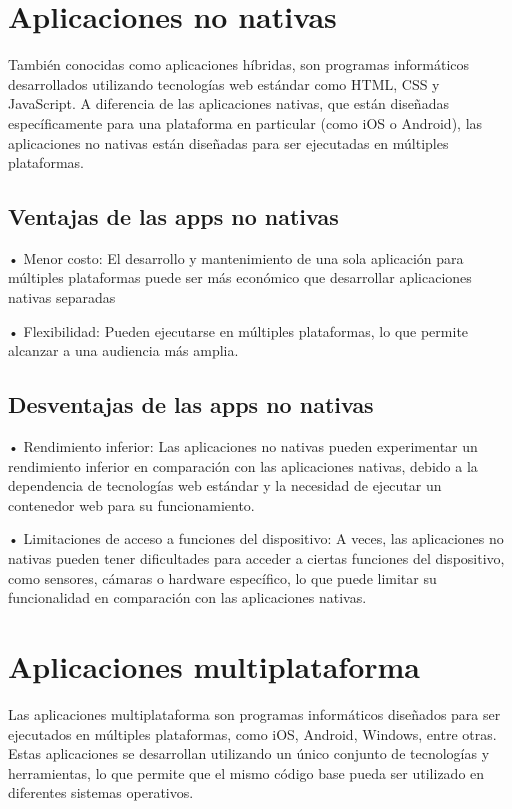 \documentclass{article}
\begin{document}
\begin{multicols}{2}
	
		\section{Aplicaciones no nativas}
		También conocidas como aplicaciones híbridas, son programas informáticos desarrollados utilizando tecnologías web estándar como HTML, CSS y JavaScript. A diferencia de las aplicaciones nativas, que están diseñadas específicamente para una plataforma en particular (como iOS o Android), las aplicaciones no nativas están diseñadas para ser ejecutadas en múltiples plataformas.
		
		\subsection{Ventajas de las apps no nativas}
		
		
		• Menor costo: El desarrollo y mantenimiento de una sola aplicación para múltiples plataformas puede ser más económico que desarrollar aplicaciones nativas separadas
		
		• Flexibilidad: Pueden ejecutarse en múltiples plataformas, lo que permite alcanzar a una audiencia más amplia.
		
		\subsection{Desventajas de las apps no nativas}
    	• Rendimiento inferior: Las aplicaciones no nativas pueden experimentar un rendimiento inferior en comparación con las aplicaciones nativas, debido a la dependencia de tecnologías web estándar y la necesidad de ejecutar un contenedor web para su funcionamiento.

		• Limitaciones de acceso a funciones del dispositivo: A veces, las aplicaciones no nativas pueden tener dificultades para acceder a ciertas funciones del dispositivo, como sensores, cámaras o hardware específico, lo que puede limitar su funcionalidad en comparación con las aplicaciones nativas.

		\section{Aplicaciones multiplataforma}
		Las aplicaciones multiplataforma son programas informáticos diseñados para ser ejecutados en múltiples plataformas, como iOS, Android, Windows, entre otras. Estas aplicaciones se desarrollan utilizando un único conjunto de tecnologías y herramientas, lo que permite que el mismo código base pueda ser utilizado en diferentes sistemas operativos.
	

\end{multicols}
\end{document}
